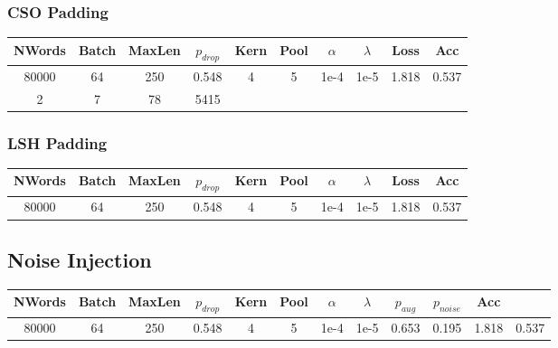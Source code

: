 \subsubsection{CSO Padding}
\begin{center}\begin{tabular}{||c c c c c c c c c c ||}
 \hline
 NWords & Batch & MaxLen & $p_{drop}$ & Kern & Pool & $\alpha$ & $\lambda$ &  Loss & Acc\\ [0.5ex]
 \hline\hline
 80000 & 64 & 250 & 0.548 & 4 & 5 & 1e-4 & 1e-5 & 1.818 & 0.537\\
 \hline
 2 & 7 & 78 & 5415 \\
 [1ex]\hline\end{tabular}\end{center}
\subsubsection{LSH Padding}
\begin{center}\begin{tabular}{||c c c c c c c c c c ||}
 \hline
 NWords & Batch & MaxLen & $p_{drop}$ & Kern & Pool & $\alpha$ & $\lambda$ &  Loss & Acc\\ [0.5ex]
 \hline\hline
 80000 & 64 & 250 & 0.548 & 4 & 5 & 1e-4 & 1e-5 & 1.818 & 0.537\\
 [1ex]\hline\end{tabular}\end{center}

\subsection{Noise Injection}
\begin{center}
 \begin{tabular}{||c c c c c c c c c c c c||}
 \hline
 NWords & Batch & MaxLen & $p_{drop}$ & Kern & Pool & $\alpha$ & $\lambda$ & $p_{aug}$ & $p_{noise}$ & Acc\\ [0.5ex]
 \hline\hline
 80000 & 64 & 250 & 0.548 & 4 & 5 & 1e-4 & 1e-5 & 0.653 & 0.195 & 1.818 & 0.537\\
[1ex]\hline\end{tabular}\end{center}
